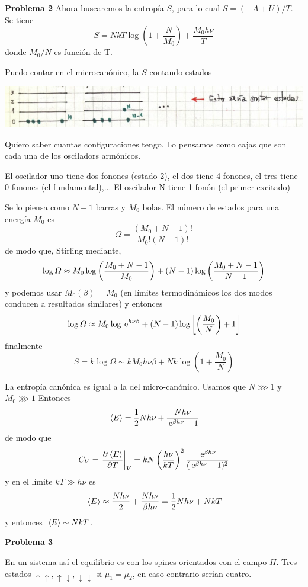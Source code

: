\documentclass[10pt,oneside]{CBFT_book}
\begin{document}
\begin{ejemplo}{\bf Problema 2}
Ahora buscaremos la entropía $S$, para lo cual $S = (- A + U ) / T $. Se tiene
\[
	S = N k T \log \left( 1 + \frac{N}{M_0} \right) + \frac{M_0 h \nu }{T}
\]
donde $M_0/N$ es función de T.

Puedo contar en el microcanónico, la $S$ contando estados

\includegraphics[scale=0.5]{images/1606329418.jpg} 

Quiero saber cuantas configuraciones tengo. Lo pensamos como cajas que son 
cada una de los osciladors armónicos.

El oscilador uno tiene dos fonones (estado 2), el dos tiene 4 fonones, el tres
tiene 0 fonones (el fundamental),...
El oscilador N tiene 1 fonón (el primer excitado)

Se lo piensa como $N-1$ barras y $M_0$ bolas. El número de estados para una energía $M_0$ es
\[
	\Omega = \frac{(M_0+N-1)!}{ M_0!(N-1)!}
\]
de modo que, Stirling mediante,
\[
	\log \Omega \approx M_0 \log \left( \frac{ M_0+N-1 }{ M_0 } \right) + (N-1)\log \left( \frac{ M_0+N-1 }{ N-1 } \right)
\]
y podemos usar $M_0( \beta)=M_0$ (en límites termodinámicos los dos modos conducen a
resultados similares) y entonces
\[
	\log \Omega \approx M_0 \log \:\mathrm{e}^{ h \nu \beta } + (N-1)\log \left[ \left( \frac{ M_0 }{ N } \right) + 1 \right]
\]
finalmente
\[
	S = k \log \Omega \sim k M_0 h \nu \beta + N k \log \left( 1 + \frac {M_0} N \right)
\]

La entropía canónica es igual a la del micro-canónico. Usamos que $N \ggg 1$ y $M_0 \ggg 1$
Entonces
\[
	 \:\left\langle E \right\rangle = \frac{1}{2} N h \nu + \frac{ N h \nu }{ \:\mathrm{e}^{ \beta h \nu } - 1 }
\]
de modo que 
\[
	C_V = \left.\frac{\partial^{\hspace{-0.05em}} {\:\left\langle E \right\rangle}}{\partial {T}^{\hspace{-0.05em}}}\right|_{V} = k N \left( \frac{ h\nu }{ kT } \right)^2 \frac{\:\mathrm{e}^{\beta h \nu}}{(\:\mathrm{e}^{\beta h \nu}-1)^2}
\]
y en el límite $ k T \gg h \nu $ es
\[
	\:\left\langle E \right\rangle \approx \frac{ N h \nu }{2} + \frac{ N h \nu }{ \beta h \nu } = \frac{1}{2} N h \nu + N k T
\]
y entonces $\:\left\langle E \right\rangle \sim NkT$.

\end{ejemplo}

\begin{ejemplo}{\bf Problema 3}

En un sistema así el equilibrio es con los spines orientados con el campo $H$. Tres estados
$\uparrow\uparrow, \uparrow\downarrow, \downarrow\downarrow$ si $ \mu_1 = \mu_2 $, en caso contrario
serían cuatro.





\end{ejemplo}
\end{document}
